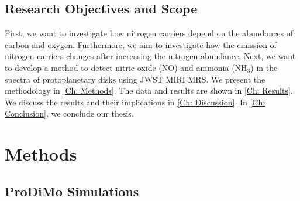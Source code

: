 \documentclass[twoside, single, authoryear, semicolon, 12pt]{lion-msc}
\newcommand{\4}{$_4$}
\newcommand{\3}{$_3$}
\newcommand{\2}{$_2$}
\begin{document}
\section{Research Objectives and Scope}
First, we want to investigate how nitrogen carriers depend on the abundances of carbon and oxygen. Furthermore, we aim to investigate how the emission of nitrogen carriers changes after increasing the nitrogen abundance. Next, we want to develop a method to detect nitric oxide (NO) and ammonia (NH\3) in the spectra of protoplanetary disks using JWST MIRI MRS. 
We present the methodology in \autoref{Ch: Methods}. The data and results are shown in \autoref{Ch: Results}. We discuss the results and their implications in \autoref{Ch: Discussion}. In \autoref{Ch: Conclusion}, we conclude our thesis.


\chapter{Methods}\label{Ch: Methods}
\section{ProDiMo Simulations}
\end{document}
